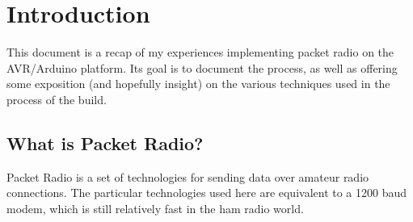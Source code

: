 \chapter{Introduction}
This document is a recap of my experiences implementing packet radio
on the AVR/Arduino platform.  Its goal is to document the process, as
well as offering some exposition (and hopefully insight) on the
various techniques used in the process of the build.


\section{What is Packet Radio?}

Packet Radio is a set of technologies for sending data over amateur
radio connections.  The particular technologies used here are
equivalent to a 1200 baud modem, which is still relatively fast in the
ham radio world.

